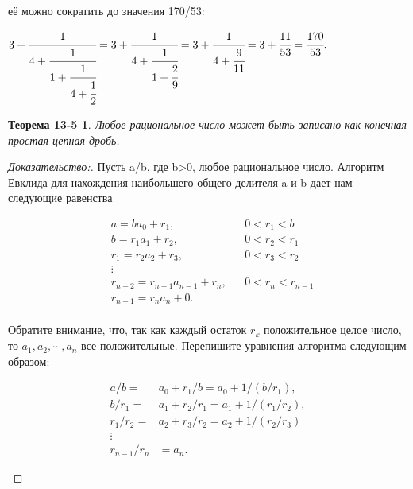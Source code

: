 \documentclass{article}
\begin{document}
{её можно сократить до значения 170/53:

\begin{center}
	$3+\cfrac{1}{
		4+\cfrac{1}{
			1+\cfrac{1}{
				4+\cfrac{1}{2}}}}=3+\cfrac{1}{
		4+\cfrac{1}{
			1+\cfrac{2}{9}}}
	=3+\cfrac{1}{
		4+\cfrac{9}{11}}
	=3+\cfrac{11}{53}=\cfrac{170}{53}.$						
\end{center}
	
\newpage
\rhead{\textbf{\thepage}}

\newtheorem*{theorem}{Теорема 13-5}
\begin{theorem}
	Любое рациональное число может быть записано как конечная простая цепная дробь.
\end{theorem}

\begin{proof}[Доказательство:]
	Пусть a/b, где b>0, любое рациональное число. Алгоритм Евклида для нахождения наибольшего общего делителя a и b дает нам следующие равенства\\
	
	\begin{center}
		\begin{align*}
		&a=ba_0 + r_1, &&0<r_1<b\\ 			
		&b=r_1a_1 + r_2, &&0<r_2<r_1\\
		&r_1=r_2a_2 + r_3, &&0<r_3<r_2\\
		&\vdots\\
		&r_{n-2}=r_{n-1}a_{n-1} + r_n, &&0<r_n<r_{n-1}\\
		&r_{n-1}=r_na_n + 0.\\		
	\end{align*}
\end{center}
	
Обратите внимание, что, так как каждый остаток $r_k$ положительное целое число, то $a_1,a_2,\cdots,a_n$ все положительные. Перепишите уравнения алгоритма следующим образом:\\

\begin{center}
	\begin{align*}
	a/b=&a_0 + r_1/b=a_0 + 1/(b/r_1),\\
	b/r_1=&a_1 + r_2/r_1=a_1 + 1/(r_1/r_2),\\
	r_1/r_2=&a_2 + r_3/r_2=a_2 + 1/(r_2/r_3)\\
	\vdots\\
	r_{n-1}/r_n&=a_n.			
	\end{align*}
\end{center}


\end{proof}}
\end{document}
